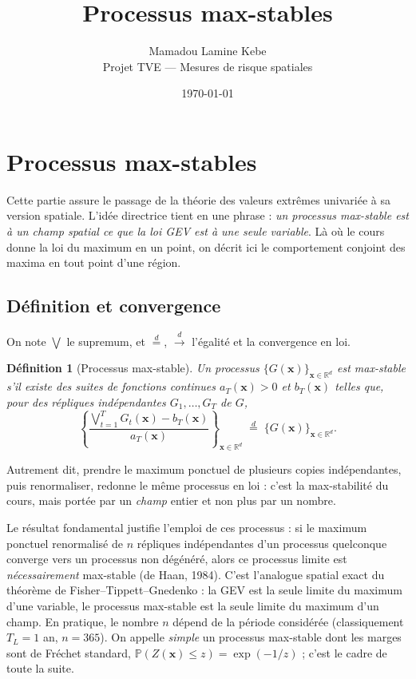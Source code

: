 \documentclass[11pt,a4paper]{article}
\title{Processus max-stables}
\author{Mamadou Lamine Kebe \\ \small Projet TVE — Mesures de risque spatiales}
\date{\today}
\newtheorem{definition}[theoreme]{Définition}
\newcommand{\R}{\mathbb{R}}
\newcommand{\PP}{\mathbb{P}}
\begin{document}
\maketitle

\section{Processus max-stables}

Cette partie assure le passage de la théorie des valeurs extrêmes univariée à sa
version spatiale. L'idée directrice tient en une phrase : \emph{un processus
max-stable est à un champ spatial ce que la loi GEV est à une seule variable}.
Là où le cours donne la loi du maximum en un point, on décrit ici le
comportement conjoint des maxima en tout point d'une région.

\subsection{Définition et convergence}

On note $\bigvee$ le supremum, et $\overset{d}{=}$, $\overset{d}{\to}$ l'égalité
et la convergence en loi.

\begin{definition}[Processus max-stable]
Un processus $\{G(\mathbf x)\}_{\mathbf x\in\R^d}$ est \emph{max-stable} s'il
existe des suites de fonctions continues $a_T(\mathbf x)>0$ et $b_T(\mathbf x)$
telles que, pour des répliques indépendantes $G_1,\dots,G_T$ de $G$,
\[
\left\{\frac{\bigvee_{t=1}^T G_t(\mathbf x)-b_T(\mathbf x)}{a_T(\mathbf x)}\right\}_{\mathbf x\in\R^d}
\;\overset{d}{=}\; \{G(\mathbf x)\}_{\mathbf x\in\R^d}.
\]
\end{definition}

Autrement dit, prendre le maximum ponctuel de plusieurs copies indépendantes,
puis renormaliser, redonne le même processus en loi : c'est la max-stabilité du
cours, mais portée par un \emph{champ} entier et non plus par un nombre.

Le résultat fondamental justifie l'emploi de ces processus : si le maximum
ponctuel renormalisé de $n$ répliques indépendantes d'un processus quelconque
converge vers un processus non dégénéré, alors ce processus limite est
\emph{nécessairement} max-stable (de Haan, 1984). C'est l'analogue spatial exact
du théorème de Fisher--Tippett--Gnedenko : la GEV est la seule limite du maximum
d'une variable, le processus max-stable est la seule limite du maximum d'un
champ. En pratique, le nombre $n$ dépend de la période considérée (classiquement
$T_L=1$ an, $n=365$). On appelle \emph{simple} un processus max-stable dont les
marges sont de Fréchet standard, $\PP(Z(\mathbf x)\le z)=\exp(-1/z)$ ; c'est le
cadre de toute la suite.
\end{document}
